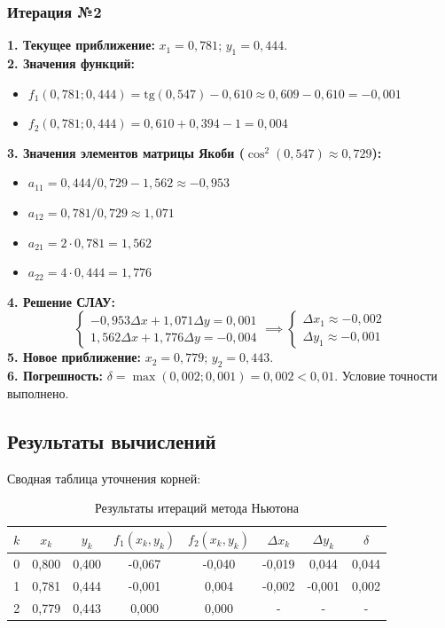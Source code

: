 \documentclass[a4paper,12pt]{article}
\begin{document}
\subsubsection*{Итерация №2}
\textbf{1. Текущее приближение:} $x_1 = 0,781$; $y_1 = 0,444$. \\
\textbf{2. Значения функций:}
\begin{itemize}
    \item $f_1(0,781; 0,444) = \text{tg}(0,547) - 0,610 \approx 0,609 - 0,610 = -0,001$
    \item $f_2(0,781; 0,444) = 0,610 + 0,394 - 1 = 0,004$
\end{itemize}
\textbf{3. Значения элементов матрицы Якоби ($\cos^2(0,547) \approx 0,729$):}
\begin{itemize}
    \item $a_{11} = 0,444 / 0,729 - 1,562 \approx -0,953$
    \item $a_{12} = 0,781 / 0,729 \approx 1,071$
    \item $a_{21} = 2 \cdot 0,781 = 1,562$
    \item $a_{22} = 4 \cdot 0,444 = 1,776$
\end{itemize}
\textbf{4. Решение СЛАУ:}
\begin{equation*}
\begin{cases} -0,953 \Delta x + 1,071 \Delta y = 0,001 \\ 1,562 \Delta x + 1,776 \Delta y = -0,004 \end{cases} \implies
\begin{cases} \Delta x_1 \approx -0,002 \\ \Delta y_1 \approx -0,001 \end{cases}
\end{equation*}
\textbf{5. Новое приближение:} $x_2 = 0,779$; $y_2 = 0,443$. \\
\textbf{6. Погрешность:} $\delta = \max(0,002; 0,001) = 0,002 < 0,01$. Условие точности выполнено.

\subsection{Результаты вычислений}
Сводная таблица уточнения корней:
\begin{table}[H]
\centering
\begin{tabular}{|c|c|c|c|c|c|c|c|}
\hline
$k$ & $x_k$ & $y_k$ & $f_1(x_k, y_k)$ & $f_2(x_k, y_k)$ & $\Delta x_k$ & $\Delta y_k$ & $\delta$ \\ \hline
0 & 0,800 & 0,400 & -0,067 & -0,040 & -0,019 & 0,044 & 0,044 \\ \hline
1 & 0,781 & 0,444 & -0,001 & 0,004 & -0,002 & -0,001 & 0,002 \\ \hline
2 & 0,779 & 0,443 & 0,000 & 0,000 & - & - & - \\ \hline
\end{tabular}
\caption{Результаты итераций метода Ньютона}
\end{table}
\end{document}
